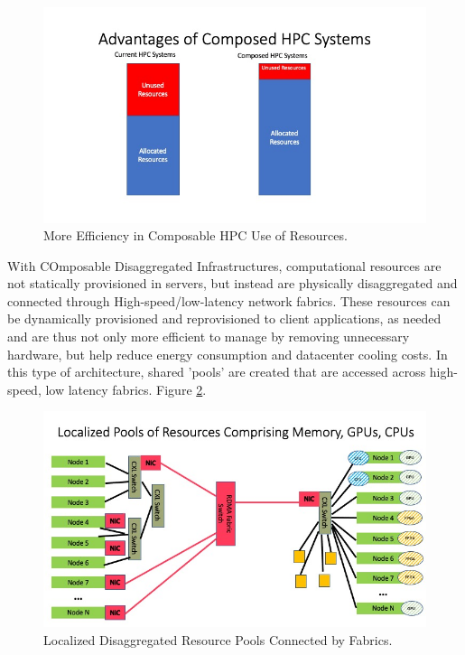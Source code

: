 \begin{figure}
\centerline{\includegraphics[width=\columnwidth]{Slide3.jpeg}}
\caption{More Efficiency in Composable HPC Use of Resources.} 
\label{fig:stranded}
\end{figure}

With COmposable Disaggregated Infrastructures, computational resources are not statically provisioned in servers, but instead are physically disaggregated and connected through High-speed/low-latency network fabrics.  These resources can be dynamically provisioned and reprovisioned to client applications, as needed and are thus not only more efficient to manage by removing unnecessary hardware, but help reduce energy consumption and datacenter cooling costs.  In this type of architecture, shared 'pools' are created that are accessed across high-speed, low latency fabrics. Figure \ref{fig:Pools}.  

\begin{figure}
\centerline{\includegraphics[width=\columnwidth]{Slide4.jpeg}}
\caption{Localized Disaggregated Resource Pools Connected by Fabrics.} 
\label{fig:Pools}
\end{figure}
  
